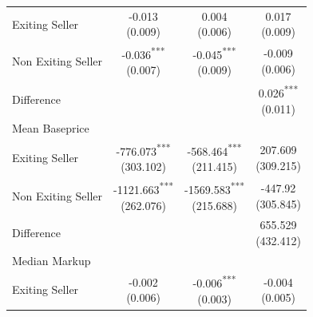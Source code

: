 \begin{tabular}{l|ccc}
\midrule
Exiting Seller & \makecell{-0.013 \\ (0.009)\\[0.25em]} & \makecell{0.004 \\ (0.006)\\[0.25em]} & \makecell{0.017 \\ (0.009)\\[0.25em]} \\
Non Exiting Seller & \makecell{-0.036\textsuperscript{***} \\ (0.007)\\[0.25em]} & \makecell{-0.045\textsuperscript{***} \\ (0.009)\\[0.25em]} & \makecell{-0.009 \\ (0.006)\\[0.25em]} \\
Difference &  &  & \makecell{0.026\textsuperscript{***} \\ (0.011)\\[0.25em]} \\
\midrule
Mean Baseprice \\
\midrule
Exiting Seller & \makecell{-776.073\textsuperscript{***} \\ (303.102)\\[0.25em]} & \makecell{-568.464\textsuperscript{***} \\ (211.415)\\[0.25em]} & \makecell{207.609 \\ (309.215)\\[0.25em]} \\
Non Exiting Seller & \makecell{-1121.663\textsuperscript{***} \\ (262.076)\\[0.25em]} & \makecell{-1569.583\textsuperscript{***} \\ (215.688)\\[0.25em]} & \makecell{-447.92 \\ (305.845)\\[0.25em]} \\
Difference &  &  & \makecell{655.529 \\ (432.412)\\[0.25em]} \\
\midrule
Median Markup \\
\midrule
Exiting Seller & \makecell{-0.002 \\ (0.006)\\[0.25em]} & \makecell{-0.006\textsuperscript{***} \\ (0.003)\\[0.25em]} & \makecell{-0.004 \\ (0.005)\\[0.25em]} \\

\end{tabular}
